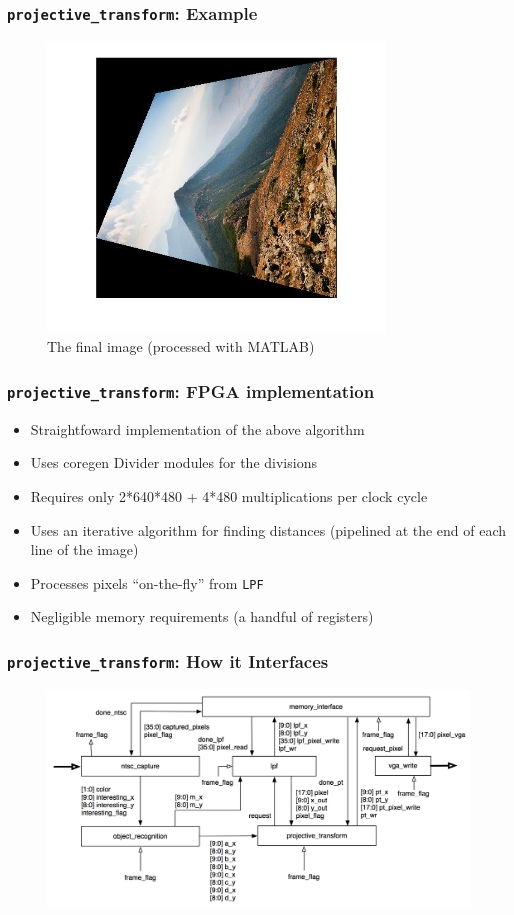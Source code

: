 \documentclass{beamer}
\begin{document}
\begin{frame}
	\frametitle{{\tt projective\_transform}: Example}
	\begin{figure}
		\centering
		\includegraphics[width=0.8\textwidth]{images/skew_example/projected_final.jpg}
		\caption{The final image (processed with MATLAB)}
	\end{figure}
\end{frame}

\begin{frame}
	\frametitle{{\tt projective\_transform}: FPGA implementation}
	\begin{itemize}
	\item Straightfoward implementation of the above algorithm
	\item Uses coregen Divider modules for the divisions
	\item Requires only 2*640*480 + 4*480 multiplications per clock cycle
	\item Uses an iterative algorithm for finding distances (pipelined at the end of each line of the image)
	\item Processes pixels ``on-the-fly'' from {\tt LPF}
	\item Negligible memory requirements (a handful of registers)
	\end{itemize}
\end{frame}


\begin{frame}
	\frametitle{{\tt projective\_transform}: How it Interfaces}
	\begin{figure}
		\centering
		\includegraphics[width=\textwidth]{../proposal/block_diagram_with_wires.png}
	\end{figure}
\end{frame}
\end{document}
